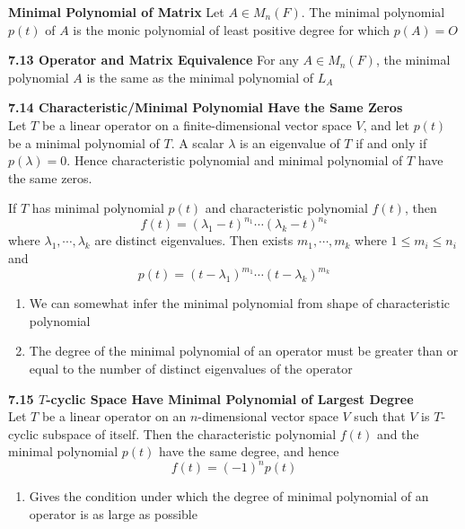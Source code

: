 \documentclass[11pt]{article}
\begin{document}
\begin{defn*}
    \textbf{Minimal Polynomial of Matrix} Let $A\in M_{n}(F)$. The minimal polynomial $p(t)$ of $A$ is the monic polynomial of least positive degree for which $p(A)=O$
\end{defn*}

\begin{theorem*}
    \textbf{7.13 Operator and Matrix Equivalence} For any $A\in M_n(F)$, the minimal polynomial $A$ is the same as the minimal polynomial of $L_A$
\end{theorem*}

\begin{theorem*}
    \textbf{7.14 Characteristic/Minimal Polynomial Have the Same Zeros} \\
    Let $T$ be a linear operator on a finite-dimensional vector space $V$, and let $p(t)$ be a minimal polynomial of $T$. A scalar $\lambda$ is an eigenvalue of $T$ if and only if $p(\lambda)=0$. Hence characteristic polynomial and minimal polynomial of $T$ have the same zeros.
\end{theorem*}

\begin{corollary*}
    If $T$ has minimal polynomial $p(t)$ and characteristic polynomial $f(t)$, then 
    \[
        f(t) = (\lambda_1 - t)^{n_1} \cdots  (\lambda_k - t)^{n_k}
    \]
    where $\lambda_1, \cdots, \lambda_k$ are distinct eigenvalues. Then exists $m_1, \cdots, m_k$ where $1\leq m_i \leq n_i$ and 
    \[
        p(t) = (t-\lambda_1)^{m_1} \cdots (t-\lambda_k)^{m_k}
    \]
    \begin{enumerate}
        \item We can somewhat infer the minimal polynomial from shape of characteristic polynomial
        \item The degree of the minimal polynomial of an operator must be greater than or equal to the number of distinct eigenvalues of the operator
    \end{enumerate}
\end{corollary*}


\begin{theorem*}
    \textbf{7.15 $T$-cyclic Space Have Minimal Polynomial of Largest Degree} \\ 
    Let $T$ be a linear operator on an $n$-dimensional vector space $V$ such that $V$ is $T$-cyclic subspace of itself. Then the characteristic polynomial $f(t)$ and the minimal polynomial $p(t)$ have the same degree, and hence 
    \[
        f(t) = (-1)^n p(t)    
    \]
    \begin{enumerate}
        \item Gives the condition under which the degree of minimal polynomial of an operator is as large as possible
    \end{enumerate}
\end{theorem*}
\end{document}
